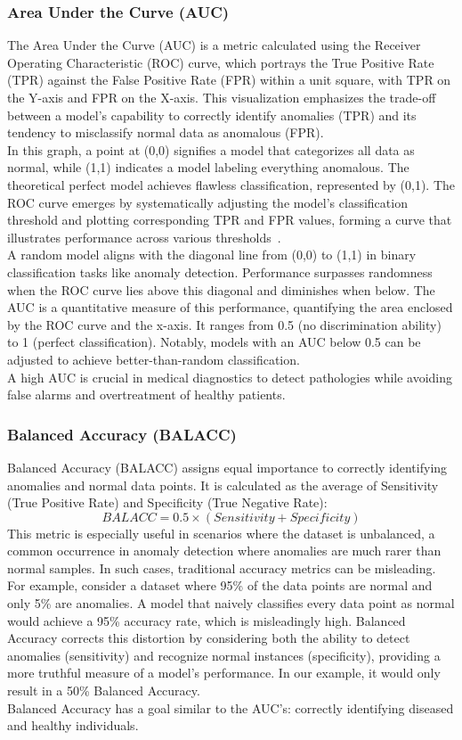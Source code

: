 \subsubsection{Area Under the Curve (AUC)}
The Area Under the Curve (AUC) is a metric calculated using the Receiver Operating Characteristic (ROC) curve, which portrays the True Positive Rate (TPR) against the False Positive Rate (FPR) within a unit square, with TPR on the Y-axis and FPR on the X-axis. This visualization emphasizes the trade-off between a model's capability to correctly identify anomalies (TPR) and its tendency to misclassify normal data as anomalous (FPR).\\
In this graph, a point at (0,0) signifies a model that categorizes all data as normal, while (1,1) indicates a model labeling everything anomalous. The theoretical perfect model achieves flawless classification, represented by (0,1). The ROC curve emerges by systematically adjusting the model's classification threshold and plotting corresponding TPR and FPR values, forming a curve that illustrates performance across various thresholds~\cite{fawcett2006introduction}.\\
A random model aligns with the diagonal line from (0,0) to (1,1) in binary classification tasks like anomaly detection. Performance surpasses randomness when the ROC curve lies above this diagonal and diminishes when below. The AUC is a quantitative measure of this performance, quantifying the area enclosed by the ROC curve and the x-axis. It ranges from 0.5 (no discrimination ability) to 1 (perfect classification). Notably, models with an AUC below 0.5 can be adjusted to achieve better-than-random classification.\\
A high AUC is crucial in medical diagnostics to detect pathologies while avoiding false alarms and overtreatment of healthy patients.

\subsubsection{Balanced Accuracy (BALACC)}
Balanced Accuracy (BALACC) assigns equal importance to correctly identifying anomalies and normal data points. It is calculated as the average of Sensitivity (True Positive Rate) and Specificity (True Negative Rate):
\[ BALACC=0.5 \times (Sensitivity + Specificity) \]
This metric is especially useful in scenarios where the dataset is unbalanced, a common occurrence in anomaly detection where anomalies are much rarer than normal samples. In such cases, traditional accuracy metrics can be misleading. For example, consider a dataset where 95\% of the data points are normal and only 5\% are anomalies. A model that naively classifies every data point as normal would achieve a 95\% accuracy rate, which is misleadingly high. Balanced Accuracy corrects this distortion by considering both the ability to detect anomalies (sensitivity) and recognize normal instances (specificity), providing a more truthful measure of a model's performance. In our example, it would only result in a 50\% Balanced Accuracy.\\
Balanced Accuracy has a goal similar to the AUC's: correctly identifying diseased and healthy individuals.



